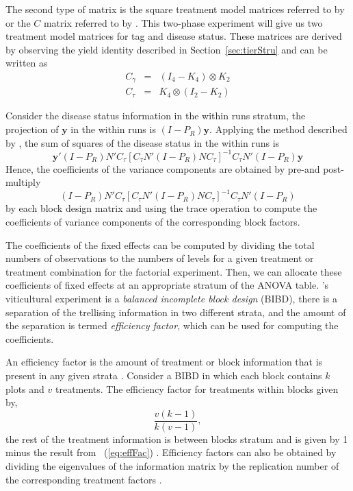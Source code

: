 \documentclass[article]{jss}
\begin{document}
The second type of matrix is the square treatment model matrices referred to by \cite{Nelder1965B} or the $C$ matrix referred to by \cite{John1987}. This two-phase experiment will give us two treatment model matrices for tag and disease status. These matrices are derived by observing the yield identity described in Section~\ref{sec:tierStru} and can be written as
\begin{eqnarray*}
C_{\gamma} &=& (I_4 - K_4) \otimes K_2\\
C_{\tau} &=&  K_4 \otimes (I_2 - K_2)
\end{eqnarray*}

Consider the disease status information in the within runs stratum, the projection of $\bm{y}$ in the within runs is $(I-P_R)\bm{y}$. Applying the method described by \cite{Nelder1965B}, the sum of squares of the disease status in the within runs is 
\[
\bm{y}'(I-P_R)N'C_{\tau}[C_{\tau}N'(I-P_R)N C_{\tau}]^{-1} C_{\tau}N'(I-P_R)\bm{y}
\]
Hence, the coefficients of the variance components are obtained by pre-and post-multiply 
\[
(I-P_R)N'C_{\tau}[C_{\tau}N'(I-P_R)N C_{\tau}]^{-1} C_{\tau}N'(I-P_R)
\]
by each block design matrix and using the trace operation to compute the coefficients of variance components of the corresponding block factors.

The coefficients of the fixed effects can be computed by dividing the total numbers of observations to the numbers of levels for a given treatment or treatment combination for the factorial experiment. Then, we can allocate these coefficients of fixed effects at an appropriate stratum of the ANOVA table. \citeauthor{Brien1999}'s viticultural experiment is a \emph{balanced incomplete block design} (BIBD), there is a separation of the trellising information in two different strata, and the amount of the separation is termed \emph{efficiency factor}, which can be used for computing the coefficients.

An efficiency factor is the amount of treatment or block information that is present in any given strata \citep{Brien1999}. Consider a BIBD in which each block contains $k$ plots and $v$ treatments. The efficiency factor for treatments within blocks given by,
\begin{equation} \label{eq:effFac}
\frac{v(k-1)}{k(v-1)},
\end{equation}
the rest of the treatment information is between blocks stratum and is given by 1 minus the result from ~(\ref{eq:effFac}) \citep{Brien1999}. Efficiency factors can also be obtained by dividing the eigenvalues of the information matrix by the replication number of the corresponding treatment factors \citep{John1987}.
\end{document}
